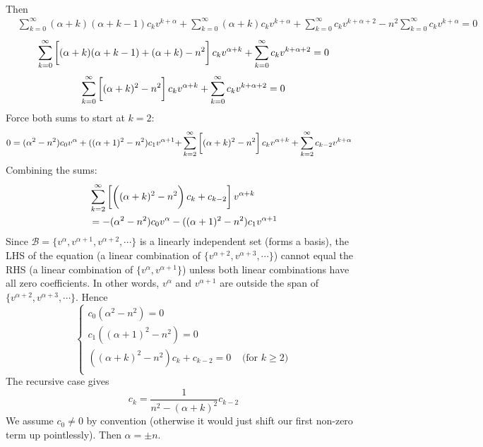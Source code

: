 \documentclass[12pt]{article}
\begin{document}
\begin{enumerate}[(a)]
{\begin{align*}
\end{align*}
Then
\begin{align*}
& \sum_{k=0}^{\infty} (\alpha + k)(\alpha + k - 1) c_k v^{k+\alpha} + \sum_{k=0}^{\infty} (\alpha + k) c_k v^{k+\alpha} + \sum_{k=0}^{\infty}  c_k v^{k+\alpha+2} - n^2 \sum_{k=0}^{\infty} c_k v^{k+\alpha}  = 0
\end{align*}
\begin{align*}
\sum_{k=0}^{\infty} \left[ \vphantom{\frac{1}{1}} (\alpha + k)(\alpha + k - 1) + (\alpha + k) - n^2 \right] c_k v^{\alpha + k} + \sum_{k=0}^{\infty}  c_k v^{k+\alpha+2} = 0 
\end{align*}
\begin{align*}
\sum_{k=0}^{\infty} \left[ \vphantom{\frac{1}{1}} (\alpha + k)^2 - n^2 \right] c_k v^{\alpha + k} + \sum_{k=0}^{\infty}  c_k v^{k+\alpha+2} = 0 
\end{align*}
Force both sums to start at $k=2$:
\begin{align*}
0 = (\alpha^2 - n^2)c_0 v^\alpha + ((\alpha + 1)^2 - n^2)c_1 v^{\alpha + 1} +& \sum_{k=2}^{\infty} \left[ \vphantom{\frac{1}{1}} (\alpha + k)^2 - n^2 \right] c_k v^{\alpha + k} + \sum_{k=2}^{\infty}  c_{k-2} v^{k+\alpha} 
\end{align*}
Combining the sums:
\begin{align*}
& \sum_{k=2}^{\infty} \left[ \left(  \vphantom{\frac{1}{1}} (\alpha + k)^2 - n^2 \right) c_k + c_{k-2}  \right] v^{\alpha + k} \\
&= -(\alpha^2 - n^2)c_0 v^\alpha - ((\alpha + 1)^2 - n^2)c_1 v^{\alpha + 1}
\end{align*}
Since $\mathcal{B} = \{v^\alpha, v^{\alpha + 1}, v^{\alpha + 2}, \cdots\}$ is a linearly independent set (forms a basis), the LHS of the equation (a linear combination of $\{v^{\alpha + 2}, v^{\alpha + 3}, \cdots\}$) cannot equal the RHS (a linear combination of $\{v^{\alpha}, v^{\alpha + 1}\}$) unless both linear combinations have all zero coefficients. In other words, $v^{\alpha}$ and $v^{\alpha + 1}$ are outside the span of $\{v^{\alpha + 2}, v^{\alpha + 3}, \cdots\}$. Hence
$$\begin{cases}
c_0(\alpha^2 - n^2) = 0 \\
c_1((\alpha + 1)^2 - n^2) = 0 \\
((\alpha + k)^2 - n^2 ) c_k + c_{k-2} = 0 \;\;\;\; \text{(for $k \geq 2$)} \\
\end{cases}$$
The recursive case gives
$$c_k = \frac{1}{n^2 - (\alpha + k)^2} c_{k-2}$$
We assume $c_0 \neq 0$ by convention (otherwise it would just shift our first non-zero term up pointlessly). Then $\alpha = \pm n$. \\ \\
}
\end{enumerate}
\end{document}
